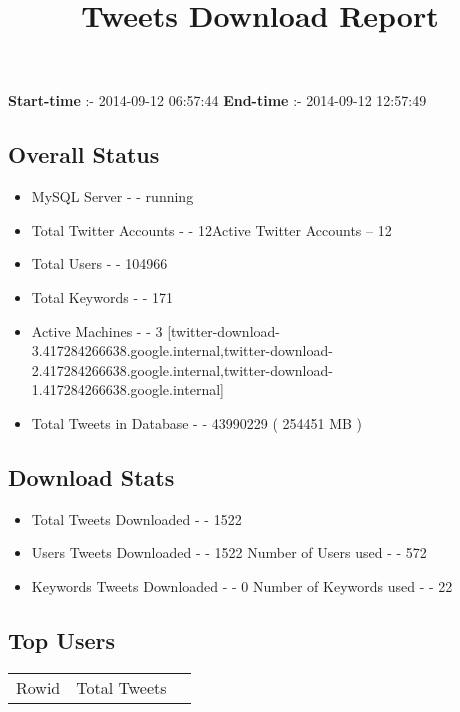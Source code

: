 \documentclass{article}\usepackage[T1]{fontenc}
\begin{document}
\title{\textbf{Tweets Download Report}}
               \date{}
                \maketitle
               \centerline{\textbf{Start-time} :- 2014-09-12 06:57:44 \hspace{40pt} \textbf{End-time} :- 2014-09-12 12:57:49}               \subsection*{Overall Status}                \begin{itemize}                \item MySQL Server - - running               \item Total Twitter Accounts - - 12\newline Active Twitter Accounts -- 12               \item Total Users - - 104966               \item Total Keywords - - 171               \item Active Machines - - 3 [twitter-download-3.417284266638.google.internal,twitter-download-2.417284266638.google.internal,twitter-download-1.417284266638.google.internal]               \item Total Tweets in Database - - 43990229 ( 254451 MB )               \end{itemize}               \subsection*{Download Stats}                \begin{itemize}                \item Total Tweets Downloaded - - 1522               \item Users Tweets Downloaded - - 1522 \newline Number of Users used - - 572               \item Keywords Tweets Downloaded - - 0 \newline Number of Keywords used - - 22              \end{itemize}              \subsection*{Top Users}\begin{tabular}{|c|c|c|}         \hline         Rowid & Total Tweets \\ 

\end{tabular}
\end{document}
